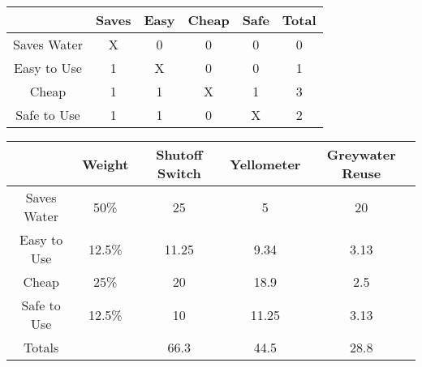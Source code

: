 \documentclass[11pt,letterpaper]{report}
\begin{document}
\vspace{1cm}

\begin{tabular}{ | c | c | c | c | c | c |}
\hline
 & Saves & Easy & Cheap & Safe & Total \\
\hline
Saves Water & X & 0 & 0 & 0  & 0 \\
Easy to Use & 1 & X & 0 & 0 & 1\\ 
Cheap & 1 & 1 & X & 1 & 3\\
Safe to Use & 1 & 1 & 0 & X & 2\\
\hline
\end{tabular}

\vspace{1cm}

\begin{tabular}{ | c | c | c | c | c |}
\hline
 & Weight & Shutoff Switch & Yellometer & Greywater Reuse \\
\hline
Saves Water & 50\% & 25 & 5 & 20 \\
Easy to Use & 12.5\% & 11.25 & 9.34 & 3.13 \\ 
Cheap & 25\% & 20 & 18.9 & 2.5 \\
Safe to Use & 12.5\% & 10 & 11.25 & 3.13 \\
\hline
Totals & & 66.3 & 44.5 & 28.8 \\
\hline
\end{tabular}
\end{document}
